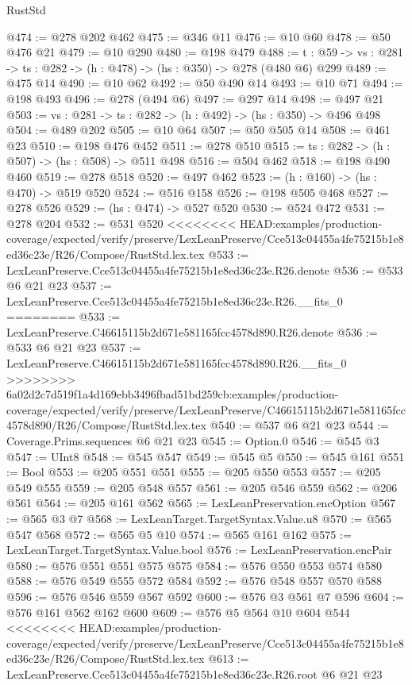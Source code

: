 \begin{lexlean}{RustStd}
\begin{coremodule}
{\begin{coremodule}
@474 := @278 @202 @462
@475 := @346 @11
@476 := @10 @60
@478 := @50 @476 @21
@479 := @10 @290
@480 := @198 @479
@488 := {t : @59} -> {vs : @281} -> {ts : @282} -> (h : @478) -> (hs : @350) -> @278 (@480 @6) @299
@489 := @475 @14
@490 := @10 @62
@492 := @50 @490 @14
@493 := @10 @71
@494 := @198 @493
@496 := @278 (@494 @6)
@497 := @297 @14
@498 := @497 @21
@503 := {vs : @281} -> {ts : @282} -> (h : @492) -> (hs : @350) -> @496 @498
@504 := @489 @202
@505 := @10 @64
@507 := @50 @505 @14
@508 := @461 @23
@510 := @198 @476 @452
@511 := @278 @510
@515 := {ts : @282} -> (h : @507) -> (hs : @508) -> @511 @498
@516 := @504 @462
@518 := @198 @490 @460
@519 := @278 @518
@520 := @497 @462
@523 := (h : @160) -> (hs : @470) -> @519 @520
@524 := @516 @158
@526 := @198 @505 @468
@527 := @278 @526
@529 := (hs : @474) -> @527 @520
@530 := @524 @472
@531 := @278 @204
@532 := @531 @520
<<<<<<<< HEAD:examples/production-coverage/expected/verify/preserve/LexLeanPreserve/Cce513c04455a4fe75215b1e8ed36c23e/R26/Compose/RustStd.lex.tex
@533 := LexLeanPreserve.Cce513c04455a4fe75215b1e8ed36c23e.R26.denote
@536 := @533 @6 @21 @23
@537 := LexLeanPreserve.Cce513c04455a4fe75215b1e8ed36c23e.R26.__fits_0
========
@533 := LexLeanPreserve.C46615115b2d671e581165fcc4578d890.R26.denote
@536 := @533 @6 @21 @23
@537 := LexLeanPreserve.C46615115b2d671e581165fcc4578d890.R26.__fits_0
>>>>>>>> 6a02d2c7d519f1a4d169ebb3496fbad51bd259cb:examples/production-coverage/expected/verify/preserve/LexLeanPreserve/C46615115b2d671e581165fcc4578d890/R26/Compose/RustStd.lex.tex
@540 := @537 @6 @21 @23
@544 := Coverage.Prims.sequences @6 @21 @23
@545 := Option.{0}
@546 := @545 @3
@547 := UInt8
@548 := @545 @547
@549 := @545 @5
@550 := @545 @161
@551 := Bool
@553 := @205 @551 @551
@555 := @205 @550 @553
@557 := @205 @549 @555
@559 := @205 @548 @557
@561 := @205 @546 @559
@562 := @206 @561
@564 := @205 @161 @562
@565 := LexLeanPreservation.encOption
@567 := @565 @3 @7
@568 := LexLeanTarget.TargetSyntax.Value.u8
@570 := @565 @547 @568
@572 := @565 @5 @10
@574 := @565 @161 @162
@575 := LexLeanTarget.TargetSyntax.Value.bool
@576 := LexLeanPreservation.encPair
@580 := @576 @551 @551 @575 @575
@584 := @576 @550 @553 @574 @580
@588 := @576 @549 @555 @572 @584
@592 := @576 @548 @557 @570 @588
@596 := @576 @546 @559 @567 @592
@600 := @576 @3 @561 @7 @596
@604 := @576 @161 @562 @162 @600
@609 := @576 @5 @564 @10 @604 @544
<<<<<<<< HEAD:examples/production-coverage/expected/verify/preserve/LexLeanPreserve/Cce513c04455a4fe75215b1e8ed36c23e/R26/Compose/RustStd.lex.tex
@613 := LexLeanPreserve.Cce513c04455a4fe75215b1e8ed36c23e.R26.root @6 @21 @23

\end{coremodule}}
\end{coremodule}
\end{lexlean}
